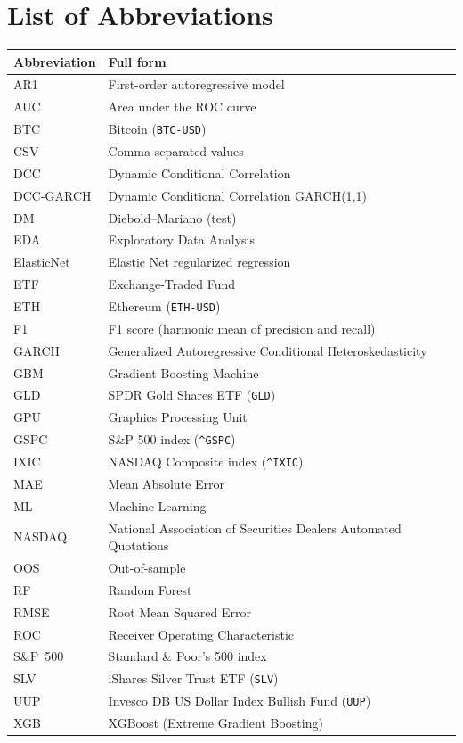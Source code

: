 \section*{List of Abbreviations}

\begin{tabular}{@{}p{3cm}p{11cm}@{}}
    \toprule
    \textbf{Abbreviation} & \textbf{Full form} \\
    \midrule
    AR1        & First-order autoregressive model \\
    AUC        & Area under the ROC curve \\
    BTC        & Bitcoin (\texttt{BTC-USD}) \\
    CSV        & Comma-separated values \\
    DCC        & Dynamic Conditional Correlation \\
    DCC-GARCH  & Dynamic Conditional Correlation GARCH(1,1) \\
    DM         & Diebold--Mariano (test) \\
    EDA        & Exploratory Data Analysis \\
    ElasticNet & Elastic Net regularized regression \\
    ETF        & Exchange-Traded Fund \\
    ETH        & Ethereum (\texttt{ETH-USD}) \\
    F1         & F1 score (harmonic mean of precision and recall) \\
    GARCH      & Generalized Autoregressive Conditional Heteroskedasticity \\
    GBM        & Gradient Boosting Machine \\
    GLD        & SPDR Gold Shares ETF (\texttt{GLD}) \\
    GPU        & Graphics Processing Unit \\
    GSPC       & S\&P 500 index (\texttt{\^{}GSPC}) \\
    IXIC       & NASDAQ Composite index (\texttt{\^{}IXIC}) \\
    MAE        & Mean Absolute Error \\
    ML         & Machine Learning \\
    NASDAQ     & National Association of Securities Dealers Automated Quotations \\
    OOS        & Out-of-sample \\
    RF         & Random Forest \\
    RMSE       & Root Mean Squared Error \\
    ROC        & Receiver Operating Characteristic \\
    S\&P~500   & Standard \& Poor's 500 index \\
    SLV        & iShares Silver Trust ETF (\texttt{SLV}) \\
    UUP        & Invesco DB US Dollar Index Bullish Fund (\texttt{UUP}) \\
    XGB        & XGBoost (Extreme Gradient Boosting) \\
    \bottomrule
\end{tabular}

\newpage
